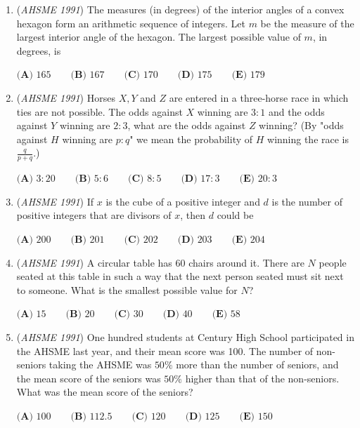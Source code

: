 \begin{enumerate}
 $\textbf{(A) } \frac{5}{4}\qquad \textbf{(B) } \frac{35}{27}\qquad \textbf{(C) } \frac{27}{20}\qquad \textbf{(D) } \frac{7}{3}\qquad \textbf{(E) } \frac{28}{49}$


	\item (\textit{AHSME 1991}) The measures (in degrees) of the interior angles of a convex hexagon form an arithmetic sequence of integers. Let $m$ be the measure of the largest interior angle of the hexagon. The largest possible value of $m$, in degrees, is


 $\textbf{(A) } 165\qquad \textbf{(B) } 167\qquad \textbf{(C) } 170\qquad \textbf{(D) } 175\qquad \textbf{(E) } 179$


	\item (\textit{AHSME 1991}) Horses $X,Y$ and $Z$ are entered in a three-horse race in which ties are not possible. The odds against $X$ winning are $3:1$ and the odds against $Y$ winning are $2:3$, what are the odds against $Z$ winning? (By "odds against $H$ winning are $p:q$" we mean the probability of $H$ winning the race is $\frac{q}{p+q}$.)


 $\textbf{(A) } 3:20\qquad \textbf{(B) } 5:6\qquad \textbf{(C) } 8:5\qquad \textbf{(D) } 17:3\qquad \textbf{(E) } 20:3$


	\item (\textit{AHSME 1991}) If $x$ is the cube of a positive integer and $d$ is the number of positive integers that are divisors of $x$, then $d$ could be


 $\textbf{(A) } 200\qquad \textbf{(B) } 201\qquad \textbf{(C) } 202\qquad \textbf{(D) } 203\qquad \textbf{(E) } 204$


	\item (\textit{AHSME 1991}) A circular table has 60 chairs around it. There are $N$ people seated at this table in such a way that the next person seated must sit next to someone. What is the smallest possible value for $N$?


 $\textbf{(A) } 15\qquad \textbf{(B) } 20\qquad \textbf{(C) } 30\qquad \textbf{(D) } 40\qquad \textbf{(E) } 58$


	\item (\textit{AHSME 1991}) One hundred students at Century High School participated in the AHSME last year, and their mean score was 100. The number of non-seniors taking the AHSME was $50\%$ more than the number of seniors, and the mean score of the seniors was $50\%$ higher than that of the non-seniors. What was the mean score of the seniors?


 $\textbf{(A) } 100\qquad \textbf{(B) } 112.5\qquad \textbf{(C) } 120\qquad \textbf{(D) } 125\qquad \textbf{(E) } 150$



\end{enumerate}

